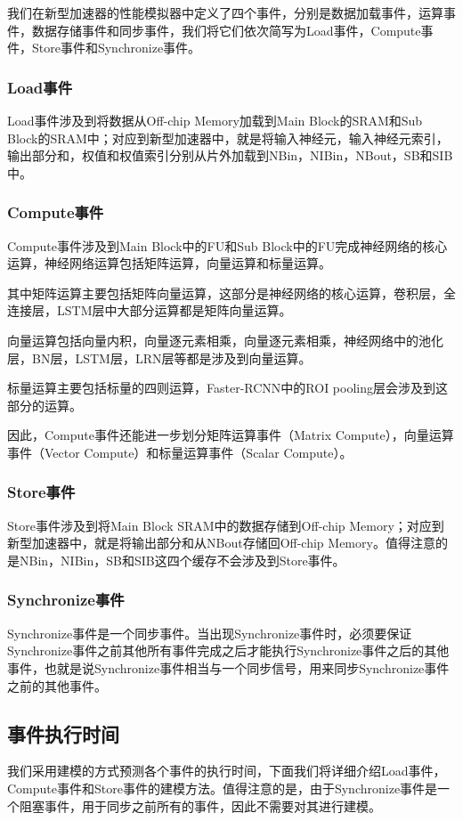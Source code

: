 我们在新型加速器的性能模拟器中定义了四个事件，分别是数据加载事件，运算事件，数据存储事件和同步事件，我们将它们依次简写为Load事件，Compute事件，Store事件和Synchronize事件。

\subsubsection{Load事件}
Load事件涉及到将数据从Off-chip Memory加载到Main Block的SRAM和Sub Block的SRAM中；对应到新型加速器中，就是将输入神经元，输入神经元索引，输出部分和，权值和权值索引分别从片外加载到NBin，NIBin，NBout，SB和SIB中。

\subsubsection{Compute事件}
Compute事件涉及到Main Block中的FU和Sub Block中的FU完成神经网络的核心运算，神经网络运算包括矩阵运算，向量运算和标量运算。

其中矩阵运算主要包括矩阵向量运算，这部分是神经网络的核心运算，卷积层，全连接层，LSTM层中大部分运算都是矩阵向量运算。

向量运算包括向量内积，向量逐元素相乘，向量逐元素相乘，神经网络中的池化层，BN层，LSTM层，LRN层等都是涉及到向量运算。

标量运算主要包括标量的四则运算，Faster-RCNN中的ROI pooling层会涉及到这部分的运算。

因此，Compute事件还能进一步划分矩阵运算事件（Matrix Compute），向量运算事件（Vector Compute）和标量运算事件（Scalar Compute）。

\subsubsection{Store事件}
Store事件涉及到将Main Block SRAM中的数据存储到Off-chip Memory；对应到新型加速器中，就是将输出部分和从NBout存储回Off-chip Memory。值得注意的是NBin，NIBin，SB和SIB这四个缓存不会涉及到Store事件。

\subsubsection{Synchronize事件}
Synchronize事件是一个同步事件。当出现Synchronize事件时，必须要保证Synchronize事件之前其他所有事件完成之后才能执行Synchronize事件之后的其他事件，也就是说Synchronize事件相当与一个同步信号，用来同步Synchronize事件之前的其他事件。

\subsection{事件执行时间}
我们采用建模的方式预测各个事件的执行时间，下面我们将详细介绍Load事件，Compute事件和Store事件的建模方法。值得注意的是，由于Synchronize事件是一个阻塞事件，用于同步之前所有的事件，因此不需要对其进行建模。

